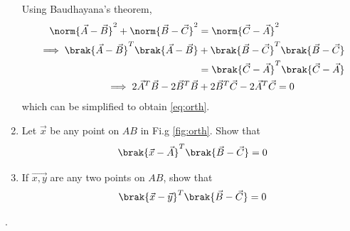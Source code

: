 \begin{enumerate}[label=\arabic*.,ref=\thesubsection.\theenumi]
%
\solution Using Baudhayana's theorem,
\begin{align}
\norm{\vec{A}-\vec{B}}^2 + \norm{\vec{B}-\vec{C}}^2 &= 
\norm{\vec{C}-\vec{A}}^2
\\
\implies 
\brak{\vec{A}-\vec{B}}^T\brak{\vec{A}-\vec{B}} 
&+ 
\brak{\vec{B}-\vec{C}}^T\brak{\vec{B}-\vec{C}} 
\nonumber \\
&= 
\brak{\vec{C}-\vec{A}}^T \brak{\vec{C}-\vec{A}}
\nonumber \\
\implies 
2\vec{A}^T\vec{B} - 2\vec{B}^T\vec{B}&+2\vec{B}^T\vec{C}-2\vec{A}^T\vec{C}
=0
\end{align}
which can be simplified to obtain \eqref{eq:orth}.
\item Let $\vec{x}$ be any point on $AB$ in Fi.g \ref{fig:orth}.  Show that
\begin{equation}
\brak{\vec{x}-\vec{A}}^T\brak{\vec{B}-\vec{C}} = 0
\end{equation}
%
\item If $\vec{x,y}$ are any two points on $AB$, show that 
\begin{equation}
\label{eq:orth_any}
\brak{\vec{x}-\vec{y}}^T\brak{\vec{B}-\vec{C}} = 0
\end{equation}


\end{enumerate}
.
